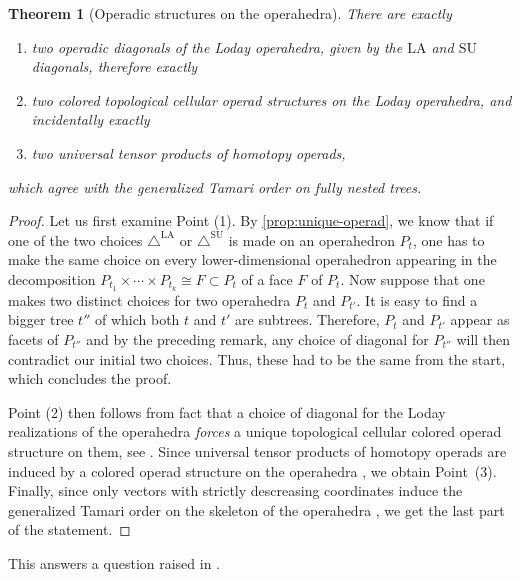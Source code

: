 \documentclass{amsart}
\newtheorem{theorem}{Theorem}[section]
\theoremstyle{definition}
\newcommand{\SU}{\mathrm{SU}}
\newcommand{\LA}{\mathrm{LA}}
\newcommand{\SUD}{\triangle^{\mathrm{SU}}}
\newcommand{\LAD}{\triangle^{\mathrm{LA}}}
\begin{document}
\begin{theorem}[Operadic structures on the operahedra] 
	\label{thm:operahedra}
There are exactly 
\begin{enumerate}
	\item two operadic diagonals of the Loday operahedra, given by the $\LA$ and $\SU$ diagonals, therefore exactly
	\item two colored topological cellular operad structures on the Loday operahedra, and incidentally exactly
	\item two universal tensor products of homotopy operads,
\end{enumerate}
which agree with the generalized Tamari order on fully nested trees. 
\end{theorem}

\begin{proof}
	Let us first examine Point (1).
	By \cref{prop:unique-operad}, we know that if one of the two choices $\LAD$ or $\SUD$ is made on an operahedron $P_t$, one has to make the same choice on every lower-dimensional operahedron appearing in the decomposition $P_{t_1} \times \cdots \times P_{t_k} \cong F \subset P_t$ of a face $F$ of $P_t$. 
	Now suppose that one makes two distinct choices for two operahedra $P_t$ and $P_{t'}$.
	It is easy to find a bigger tree $t''$ of which both $t$ and $t'$ are subtrees.
	Therefore, $P_t$ and $P_{t'}$ appear as facets of $P_{t''}$ and by the preceding remark, any choice of diagonal for $P_{t''}$ will then contradict our initial two choices. 
	Thus, these had to be the same from the start, which concludes the proof. 

	Point (2) then follows from fact that a choice of diagonal for the Loday realizations of the operahedra \emph{forces} a unique topological cellular colored operad structure on them, see \cite[Thm.~4.18]{LaplanteAnfossi}.
	Since universal tensor products of homotopy operads are induced by a colored operad structure on the operahedra \cite[Coro.~4.24]{LaplanteAnfossi}, we obtain Point~(3).
	Finally, since only vectors with strictly descreasing coordinates induce the generalized Tamari order on the skeleton of the operahedra \cite[Prop.~3.11]{LaplanteAnfossi}, we get the last part of the statement. 
\end{proof}

This answers a question raised in \cite[Rem.~3.14]{LaplanteAnfossi}.
\end{document}
